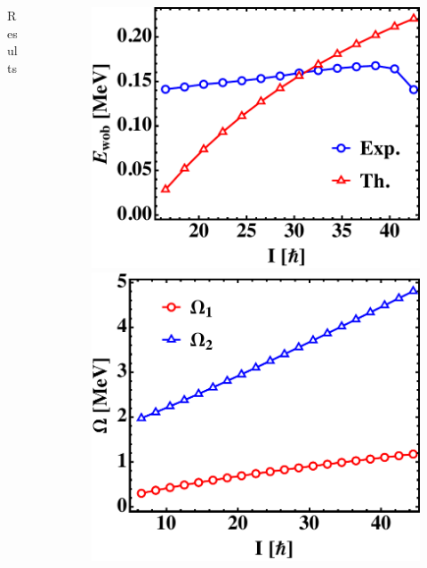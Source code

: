 \documentclass[final]{beamer}
\newlength{\sepwidth}
\newlength{\colwidth}
\newcommand{\separatorcolumn}{\begin{column}{\sepwidth}\end{column}}
\begin{document}
\begin{frame}[t]
\begin{columns}[t]
\begin{column}{\colwidth}
\begin{block}{Results}
  \end{block}
\end{column}
\separatorcolumn
\begin{column}{\colwidth}
  \begin{figure}
\centering
\begin{minipage}{.5\textwidth}
  \centering
  \includegraphics[scale=1.27]{images/wobbEnergies.pdf}
\end{minipage}%
\begin{minipage}{.5\textwidth}
  \centering
 \includegraphics[scale=1.2]{images/wobbFrequencies.pdf}

\end{minipage}
\end{figure}
\end{column}
\end{columns}
\end{frame}
\end{document}
